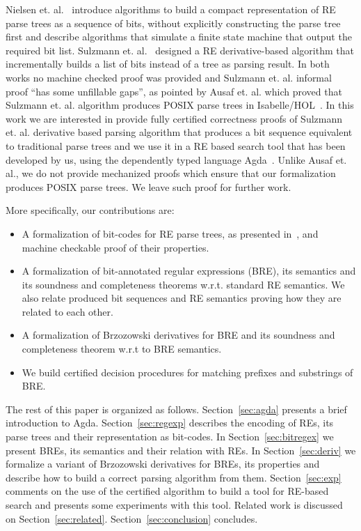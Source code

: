 \documentclass[sigconf]{acmart}
\theoremstyle{definition}
\begin{document}
Nielsen et. al.~\cite{Nielsen2011} introduce algorithms to build a compact representation of
RE parse trees as a sequence of bits, without explicitly constructing the parse tree first
and describe algorithms that simulate a finite state machine that output the required bit list. 
Sulzmann et. al.~\cite{SulzmannL14} designed a RE derivative-based algorithm
that incrementally builds a list of bits instead of a tree as parsing result. In both works
no machine checked proof was provided and Sulzmann et. al. informal proof ``has some unfillable gaps'', 
as pointed by Ausaf et. al. which proved that Sulzmann et. al. algorithm produces POSIX parse trees 
in Isabelle/HOL~\cite{AusafDU16}. In this work we are interested in provide fully 
certified correctness proofs of Sulzmann et. al. derivative based parsing algorithm that 
produces a bit sequence equivalent to traditional parse trees and we use it 
in a RE based search tool that has been developed by us, using the dependently typed language
Agda~\cite{Norell2009}. Unlike Ausaf et. al., we do not provide mechanized proofs which ensure
that our formalization produces POSIX parse trees. We leave such proof for further work.

More specifically, our contributions are:
\begin{itemize}
  \item A formalization of bit-codes for RE parse trees, as presented in~\cite{Nielsen2011},
        and machine checkable proof of their properties.
  \item A formalization of bit-annotated regular expressions (BRE), its semantics 
        and its soundness and completeness theorems w.r.t. standard RE semantics. 
        We also relate produced bit sequences and RE semantics proving how they 
        are related to each other.
  \item A formalization of Brzozowski derivatives for BRE and its soundness and
        completeness theorem w.r.t to BRE semantics.
  \item We build certified decision procedures for matching prefixes and substrings
        of BRE.
\end{itemize}

The rest of this paper is organized as follows. Section~\ref{sec:agda}
presents a brief introduction to Agda. Section~\ref{sec:regexp}
describes the encoding of REs, its parse trees and their representation as 
bit-codes. In Section~\ref{sec:bitregex} we present BREs, 
its semantics and their relation with REs. In Section~\ref{sec:deriv} 
we formalize a variant of Brzozowski derivatives for BREs, its 
properties and describe how to build a correct parsing algorithm from them. 
Section~\ref{sec:exp} comments on the use of the certified algorithm to build a tool for
RE-based search and presents some experiments with this tool. Related
work is discussed on Section~\ref{sec:related}. Section~\ref{sec:conclusion} concludes.
\end{document}
